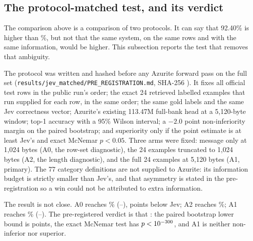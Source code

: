 \subsection{The protocol-matched test, and its verdict}
\label{sec:jev-matched}

The comparison above is a comparison of two protocols. It can say that 92.40\%
is higher than \SuiteLargeBank\%, but not that the same system, on the same rows
and with the same information, would be higher. This subsection reports the
test that removes that ambiguity.

The protocol was written and hashed before any Azurite forward pass on the full
set (\texttt{results/jev\_matched/PRE\_REGISTRATION.md}, SHA-256
\texttt{\JevMatchPreregSha}). It fixes all \JevMatchN{} official test rows in
the public run's order; the exact 24 retrieved labelled examples that run
supplied for each row, in the same order; the same gold labels and the same Jev
correctness vector; Azurite's existing 113.47M full-bank head at a
5{,}120-byte window; top-1 accuracy with a 95\% Wilson interval; a $-2.0$
point non-inferiority margin on the paired bootstrap; and superiority only if
the point estimate is at least Jev's and exact McNemar $p<0.05$. Three arms
were fixed: message only at 1{,}024 bytes (A0, the row-set diagnostic), the 24
examples truncated to 1{,}024 bytes (A2, the length diagnostic), and the full
24 examples at 5{,}120 bytes (A1, primary). The 77 category definitions are not
supplied to Azurite: its information budget is strictly smaller than Jev's, and
that asymmetry is stated in the pre-registration so a win could not be
attributed to extra information.



The result is not close. A0 reaches \JevMatchPctNoEx\%
(\JevMatchNoExLo--\JevMatchNoExHi), \JevMatchGapNoEx{} points below Jev; A2
reaches \JevMatchPctATwo\%; A1 reaches \JevMatchPctAOne\%
(\JevMatchAOneLo--\JevMatchAOneHi). The pre-registered verdict is that
\textbf{\JevMatchVerdict}: the paired bootstrap lower bound is
\JevMatchLowerAOne{} points, the exact McNemar test has $p<10^{-300}$, and
A1 is neither non-inferior nor superior.


